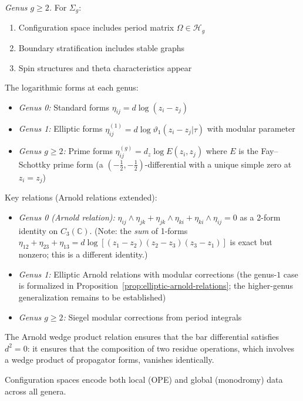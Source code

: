 \begin{example}
\emph{Genus $g \geq 2$.} For $\Sigma_g$:
\begin{enumerate}
\item Configuration space includes period matrix $\Omega \in \mathcal{H}_g$
\item Boundary stratification includes stable graphs
\item Spin structures and theta characteristics appear
\end{enumerate}

The logarithmic forms at each genus:
\begin{itemize}
\item \emph{Genus 0:} Standard forms $\eta_{ij} = d\log(z_i - z_j)$
\item \emph{Genus 1:} Elliptic forms $\eta_{ij}^{(1)} = d\log\vartheta_1(z_i - z_j|\tau)$ with modular parameter
\item \emph{Genus $g \geq 2$:} Prime forms $\eta_{ij}^{(g)} = d_z\log E(z_i, z_j)$ where $E$ is the Fay--Schottky prime form (a $(-\tfrac{1}{2},-\tfrac{1}{2})$-differential with a unique simple zero at $z_i = z_j$)
\end{itemize}

Key relations (Arnold relations extended):
\begin{itemize}
\item \emph{Genus 0 (Arnold relation):}
$\eta_{ij} \wedge \eta_{jk} + \eta_{jk} \wedge \eta_{ki} + \eta_{ki} \wedge \eta_{ij} = 0$
as a 2-form identity on $C_3(\mathbb{C})$. (Note: the \emph{sum} of 1-forms
$\eta_{12} + \eta_{23} + \eta_{13} = d\log[(z_1{-}z_2)(z_2{-}z_3)(z_3{-}z_1)]$
is exact but nonzero; this is a different identity.)
\item \emph{Genus 1:} Elliptic Arnold relations with modular corrections (the genus-$1$ case is formalized in Proposition~\ref{prop:elliptic-arnold-relations}; the higher-genus generalization remains to be established)
\item \emph{Genus $g \geq 2$:} Siegel modular corrections from period integrals
\end{itemize}

The Arnold wedge product relation ensures that the bar differential satisfies
$d^2 = 0$: it ensures that the composition of two residue operations, which involves
a wedge product of propagator forms, vanishes identically.

Configuration spaces encode both local (OPE) and global (monodromy) data across all genera.
\end{example}

